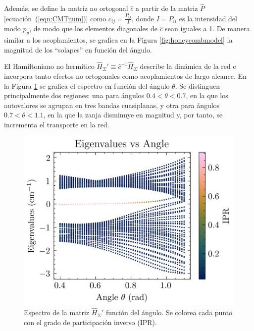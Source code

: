 Además, se define la matriz no ortogonal $\hat{c}$ a partir de la matriz $\hat{P}$ [ecuación~(\ref{eqn:CMTnum})] como $c_{ij} = \frac{P_{ij}}{I}$, donde $I = P_{ii}$ es la intensidad del modo $p_y$, de modo que los elementos diagonales de $\hat{c}$ sean iguales a 1. De manera similar a los acoplamientos, se grafica en la Figura \ref{fig:honeycombmodel} la magnitud de los ``solapes'' en función del ángulo.
 
El Hamiltoniano no hermítico $\hat{H}_\Sigma' \equiv \hat{c}^{-1} \hat{H}_\Sigma$ describe la dinámica de la red e incorpora tanto efectos no ortogonales como acoplamientos de largo alcance. En la Figura \ref{fig:honeycomb-spectra} se grafica el espectro en función del ángulo $\theta$. Se distinguen principalmente dos regiones: una para ángulos $0.4 < \theta < 0.7$, en la que los autovalores se agrupan en tres bandas cuasiplanas, y otra para ángulos $0.7 < \theta < 1.1$, en la que la zanja disminuye en magnitud y, por tanto, se incrementa el transporte en la red.

\begin{figure}[H]
	\centering
	\includegraphics[width=0.7\linewidth]{codigo/honeycomb_eigenvalues_vs_angle.png}
	\caption[Espectro de la red de panel de abeja de modos $p_y$ en función del ángulo.]{Espectro de la matriz $\hat{H}_\Sigma '$ función del ángulo. Se colorea cada punto con el grado de participación inverso (IPR). \label{fig:honeycomb-spectra}}
\end{figure}
